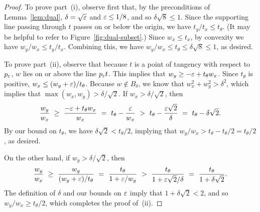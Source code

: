 \documentclass[11pt]{article}   \usepackage[letterpaper,hmargin=2.1cm,vmargin=3cm]{geometry}
\begin{document}
{\DualSubsetHelperStmt*}


\begin{proof}
To prove part~(i), observe first that, by the preconditions of Lemma~\ref{lem:dual}, $\delta = \sqrt{\varepsilon}$ and $\varepsilon \le 1/8$, and so $\delta \sqrt{8} \le 1$. Since the supporting line passing through $t$ passes on or below the origin, we have $t_y/t_x \le t_{\theta}$. (It may be helpful to refer to Figure~\ref{fig:dual-subset}.) Since $w_x \le t_x$, by convexity we have $w_y/w_x \le t_y/t_x$. Combining this, we have $w_y/w_x \le t_{\theta} \le \delta \sqrt{8} \le 1$, as desired.

To prove part~(ii), observe that because $t$ is a point of tangency with respect to $p_{\varepsilon}$, $w$ lies on or above the line $p_{\varepsilon} t$. This implies that $w_y \ge -\varepsilon + t_{\theta} w_x$. Since $t_{\theta}$ is positive, $w_x \le (w_y + \varepsilon)/t_{\theta}$. Because $w \notin B_{\delta}$, we know that $w_x^2 + w_y^2 > \delta^2$, which implies that $\max(w_x,w_y) > \delta/\sqrt{2}$. If $w_x > \delta/\sqrt{2}$, then
\[
	\frac{w_y}{w_x} 
		~ \ge ~ \frac{-\varepsilon + t_{\theta} w_x}{w_x} 
		~  =  ~ t_{\theta} - \frac{\varepsilon}{w_x} 
		~  >  ~ t_{\theta} - \frac{\varepsilon\sqrt{2}}{\delta}
		~  =  ~ t_{\theta} - \delta \sqrt{2}.
\]
By our bound on $t_{\theta}$, we have $\delta\sqrt{2} < t_{\theta}/2$, implying that $w_y/w_x > t_{\theta} - t_{\theta}/2 = t_{\theta}/2$, as desired. 

On the other hand, if $w_y > \delta/\sqrt{2}$, then 
\[
	\frac{w_y}{w_x} 
		~ \ge ~ \frac{w_y}{(w_y + \varepsilon)/t_{\theta}}
		~  =  ~ \frac{t_{\theta}}{1 + \varepsilon/w_y}
		~  >  ~ \frac{t_{\theta}}{1 + \varepsilon\sqrt{2}/\delta}
		~  =  ~ \frac{t_{\theta}}{1 + \delta\sqrt{2}}.
\]
The definition of $\delta$ and our bounds on $\varepsilon$ imply that $1 + \delta\sqrt{2} < 2$, and so $w_y/w_x \ge t_{\theta}/2$, which completes the proof of~(ii).
\end{proof}


{\BaseCapAreaStmt*}
\end{document}

